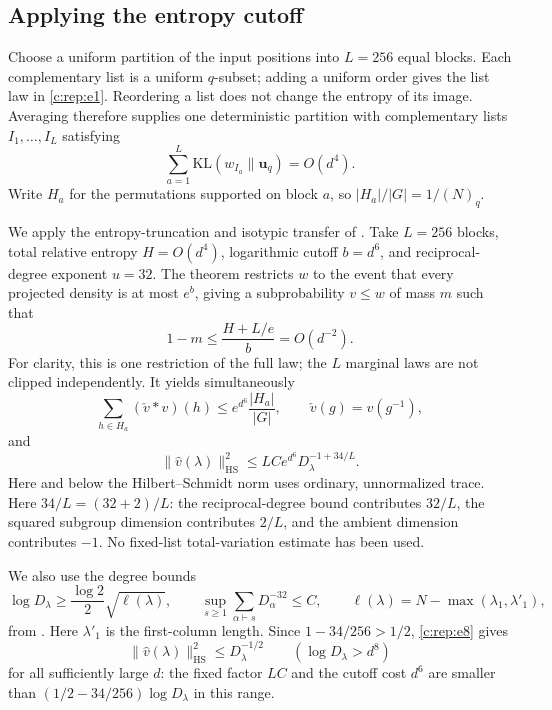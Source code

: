 \subsection{Applying the entropy cutoff}
\label{c:rep:trimming}
Choose a uniform partition of the input positions into $L=256$ equal
blocks. Each complementary list is a uniform $q$-subset; adding a
uniform order gives the list law in \eqref{c:rep:e1}. Reordering a list
does not change the entropy of its image. Averaging therefore supplies
one deterministic partition with complementary lists $I_1,\ldots,I_L$
satisfying
\[
 \sum_{a=1}^{L}\mathrm{KL}(w_{I_a}\|\mathbf u_q)=O(d^4).
\]
Write $H_a$ for the permutations supported on block $a$, so
$|H_a|/|G|=1/(N)_q$.

We apply the entropy-truncation and isotypic transfer of
\cite[Theorem~\ref*{l-l:replica-clipping}]{partialFourier}.
Take $L=256$ blocks, total relative entropy $H=O(d^4)$,
logarithmic cutoff $b=d^6$, and reciprocal-degree exponent $u=32$. The theorem
restricts $w$ to the event that every projected density is at most
$e^b$, giving a subprobability $v\le w$ of mass $m$ such that
\begin{equation}\label{c:rep:mass}
 1-m\le\frac{H+L/e}{b}=O(d^{-2}).
\end{equation}
For clarity, this is one restriction of the full law; the $L$ marginal
laws are not clipped independently. It yields simultaneously
\begin{equation}\label{c:rep:e5}
 \sum_{h\in H_a}(\check v*v)(h)
 \le e^{d^6}\frac{|H_a|}{|G|},\qquad
 \check v(g)=v(g^{-1}),
\end{equation}
and
\begin{equation}\label{c:rep:e8}
 \|\widehat v(\lambda)\|_{\mathrm{HS}}^2
 \le LC e^{d^6}D_\lambda^{-1+34/L}.
\end{equation}
Here and below the Hilbert--Schmidt norm uses ordinary, unnormalized
trace. Here $34/L=(32+2)/L$: the reciprocal-degree bound contributes $32/L$,
the squared subgroup dimension contributes $2/L$, and the ambient dimension
contributes $-1$. No fixed-list total-variation
estimate has been used.

We also use the degree bounds
\begin{equation}\label{c:rep:e6}
 \log D_\lambda\ge\frac{\log2}{2}\sqrt{\ell(\lambda)},
 \qquad
 \sup_{s\ge1}\sum_{\alpha\vdash s}D_\alpha^{-32}\le C,
 \qquad
 \ell(\lambda)=N-\max(\lambda_1,\lambda'_1),
\end{equation}
from \cite[Lemma~\ref*{l-l:degree-sqrt-deficit}]{partialFourier}.
Here $\lambda'_1$ is the first-column length. Since
$1-34/256>1/2$, \eqref{c:rep:e8} gives
\begin{equation}\label{c:rep:large-dimension}
 \|\widehat v(\lambda)\|_{\mathrm{HS}}^2\le D_\lambda^{-1/2}
 \qquad(\log D_\lambda>d^8)
\end{equation}
for all sufficiently large $d$: the fixed factor $LC$ and the cutoff
cost $d^6$ are smaller than
$(1/2-34/256)\log D_\lambda$ in this range.

